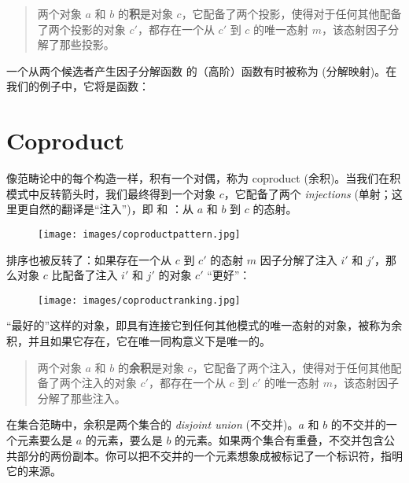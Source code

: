 \begin{quote}
  两个对象 $a$ 和 $b$ 的\textbf{积}是对象 $c$，它配备了两个投影，使得对于任何其他配备了两个投影的对象 $c'$，都存在一个从 $c'$ 到 $c$ 的唯一态射 $m$，该态射因子分解了那些投影。
\end{quote}

\noindent
一个从两个候选者产生因子分解函数  的（高阶）函数有时被称为  (分解映射)。在我们的例子中，它将是函数：


\section{Coproduct}

像范畴论中的每个构造一样，积有一个对偶，称为 coproduct (余积)。当我们在积模式中反转箭头时，我们最终得到一个对象 $c$，它配备了两个 \emph{injections} (单射；这里更自然的翻译是“注入”)，即  和 ：从 $a$ 和 $b$ 到 $c$ 的态射。


\begin{figure}[H]
  \centering
  \texttt{[image: images/coproductpattern.jpg]}
\end{figure}

\noindent
排序也被反转了：如果存在一个从 $c$ 到 $c'$ 的态射 $m$ 因子分解了注入 $i'$ 和 $j'$，那么对象 $c$ 比配备了注入 $i'$ 和 $j'$ 的对象 $c'$ “更好”：


\begin{figure}[H]
  \centering
  \texttt{[image: images/coproductranking.jpg]}
\end{figure}

\noindent
“最好的”这样的对象，即具有连接它到任何其他模式的唯一态射的对象，被称为余积，并且如果它存在，它在唯一同构意义下是唯一的。

\begin{quote}
  两个对象 $a$ 和 $b$ 的\textbf{余积}是对象 $c$，它配备了两个注入，使得对于任何其他配备了两个注入的对象 $c'$，都存在一个从 $c$ 到 $c'$ 的唯一态射 $m$，该态射因子分解了那些注入。
\end{quote}

\noindent
在集合范畴中，余积是两个集合的 \emph{disjoint union} (不交并)。$a$ 和 $b$ 的不交并的一个元素要么是 $a$ 的元素，要么是 $b$ 的元素。如果两个集合有重叠，不交并包含公共部分的两份副本。你可以把不交并的一个元素想象成被标记了一个标识符，指明它的来源。

